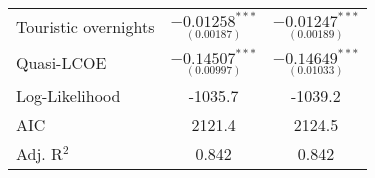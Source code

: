 \begin{ThreePartTable}
\begin{longtable}{l c c}
         Touristic overnights                         & $\underset{(0.00187)}{-0.01258^{***}}$ & $\underset{(0.00189)}{-0.01247^{***}}$ \\
         Quasi-LCOE                                   & $\underset{(0.00997)}{-0.14507^{***}}$ & $\underset{(0.01033)}{-0.14649^{***}}$ \\ \midrule
         Log-Likelihood                               & -1035.7                      & -1039.2    \\
         AIC                                          & 2121.4                       & 2124.5   \\
         Adj. R$^2$                                   & 0.842                        & 0.842      \\
    \end{longtable}
\end{ThreePartTable}
